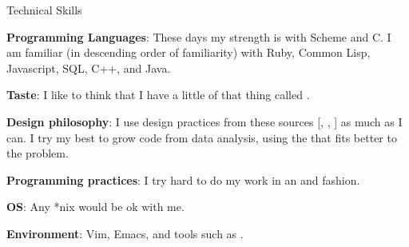 \begin{rubric}{Technical Skills}{ 

  \entry* \textbf{Programming Languages}: These days my strength is
  with Scheme and C. I am familiar (in descending order of
  familiarity) with Ruby, Common Lisp, Javascript, SQL, C++, and
  Java.
  
  \entry* \textbf{Taste}: I like to think that I have a little of that thing
  called .

  \entry* \textbf{Design philosophy}: I use design practices from
  these sources
  [,
    ,
    ]
  as much as I can. I try my best to grow code from data analysis,
  using the
  that fits better to the problem.

  \entry* \textbf{Programming practices}: I try hard to do my work in an
  and
  fashion.

  \entry* \textbf{OS}: Any *nix would be ok with me.

  \entry* \textbf{Environment}: Vim, Emacs, and tools such as 
  .

}\end{rubric}
